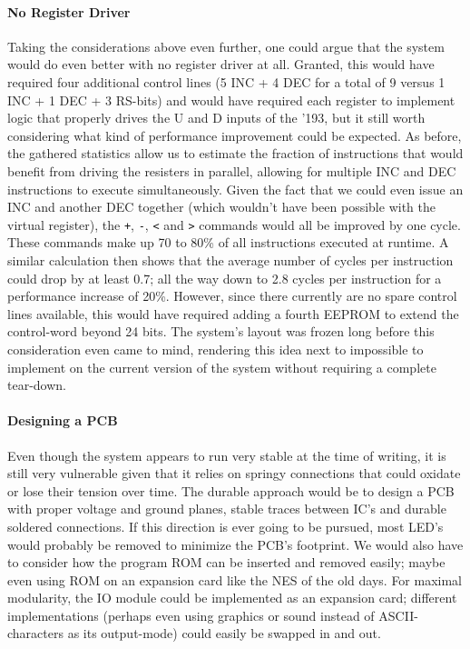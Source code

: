 \paragraph{No Register Driver} Taking the considerations above even further, one could argue that the system would do even better with no register driver at all. Granted, this would have required four additional control lines (5 INC + 4 DEC for a total of 9 versus 1 INC + 1 DEC + 3 RS-bits) and would have required each register to implement logic that properly drives the U and D inputs of the '193, but it still worth considering what kind of performance improvement could be expected. As before, the gathered statistics allow us to estimate the fraction of instructions that would benefit from driving the resisters in parallel, allowing for multiple INC and DEC instructions to execute simultaneously. Given the fact that we could even issue an INC and another DEC together (which wouldn't have been possible with the virtual register), the \texttt{+}, \texttt{-}, \texttt{<} and \texttt{>} commands would all be improved by one cycle. These commands make up 70 to 80\% of all instructions executed at runtime. A similar calculation then shows that the average number of cycles per instruction could drop by at least 0.7; all the way down to 2.8 cycles per instruction for a performance increase of 20\%. However, since there currently are no spare control lines available, this would have required adding a fourth EEPROM to extend the control-word beyond 24 bits. The system's layout was frozen long before this consideration even came to mind, rendering this idea next to impossible to implement on the current version of the system without requiring a complete tear-down.

\paragraph{Designing a PCB} Even though the system appears to run very stable at the time of writing, it is still very vulnerable given that it relies on springy connections that could oxidate or lose their tension over time. The durable approach would be to design a PCB with proper voltage and ground planes, stable traces between IC's and durable soldered connections. If this direction is ever going to be pursued, most LED's would probably be removed to minimize the PCB's footprint. We would also have to consider how the program ROM can be inserted and removed easily; maybe even using ROM on an expansion card like the NES of the old days. For maximal modularity, the IO module could be implemented as an expansion card; different implementations (perhaps even using graphics or sound instead of ASCII-characters as its output-mode) could easily be swapped in and out.

